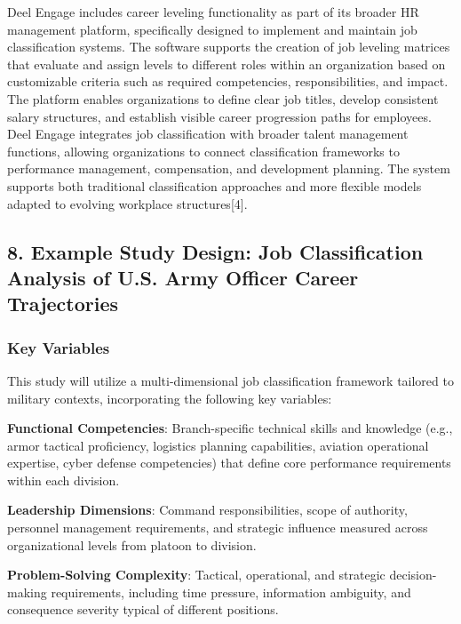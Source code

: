 \documentclass[
  letterpaper,
  DIV=11,
  numbers=noendperiod]{scrartcl}
\begin{document}
Deel Engage includes career leveling functionality as part of its
broader HR management platform, specifically designed to implement and
maintain job classification systems. The software supports the creation
of job leveling matrices that evaluate and assign levels to different
roles within an organization based on customizable criteria such as
required competencies, responsibilities, and impact. The platform
enables organizations to define clear job titles, develop consistent
salary structures, and establish visible career progression paths for
employees. Deel Engage integrates job classification with broader talent
management functions, allowing organizations to connect classification
frameworks to performance management, compensation, and development
planning. The system supports both traditional classification approaches
and more flexible models adapted to evolving workplace
structures{[}4{]}.

\subsection{8. Example Study Design: Job Classification Analysis of U.S.
Army Officer Career
Trajectories}\label{example-study-design-job-classification-analysis-of-u.s.-army-officer-career-trajectories}

\subsubsection{Key Variables}\label{key-variables}

This study will utilize a multi-dimensional job classification framework
tailored to military contexts, incorporating the following key
variables:

\textbf{Functional Competencies}: Branch-specific technical skills and
knowledge (e.g., armor tactical proficiency, logistics planning
capabilities, aviation operational expertise, cyber defense
competencies) that define core performance requirements within each
division.

\textbf{Leadership Dimensions}: Command responsibilities, scope of
authority, personnel management requirements, and strategic influence
measured across organizational levels from platoon to division.

\textbf{Problem-Solving Complexity}: Tactical, operational, and
strategic decision-making requirements, including time pressure,
information ambiguity, and consequence severity typical of different
positions.
\end{document}
